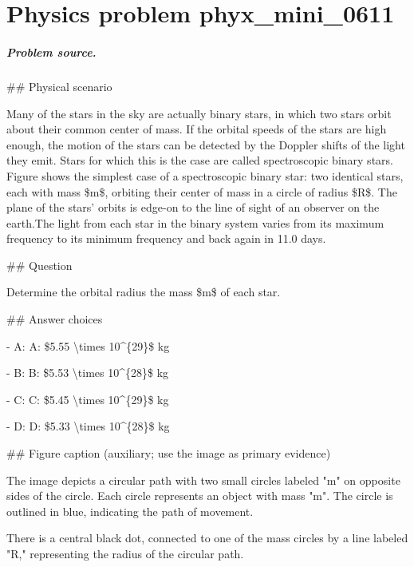 
\chapter{Physics problem phyx\_mini\_0611}
\label{ch:PhyXMiniProblems_problem_phyx_mini_0611}

\paragraph{Problem source.}
\#\# Physical scenario

Many of the stars in the sky are actually binary stars, in which two stars orbit about their common center of mass. If the orbital speeds of the stars are high enough, the motion of the stars can be detected by the Doppler shifts of the light they emit. Stars for which this is the case are called spectroscopic binary stars. Figure shows the simplest case of a spectroscopic binary star: two identical stars, each with mass \$m\$, orbiting their center of mass in a circle of radius \$R\$. The plane of the stars' orbits is edge-on to the line of sight of an observer on the earth.The light from each star in the binary system varies from its maximum frequency to its minimum frequency and back again in 11.0 days.

\#\# Question

Determine the orbital radius the mass \$m\$ of each star.

\#\# Answer choices

- A: A: \$5.55 \textbackslash{}times 10\textasciicircum{}\{29\}\$ kg

- B: B: \$5.53 \textbackslash{}times 10\textasciicircum{}\{28\}\$ kg

- C: C: \$5.45 \textbackslash{}times 10\textasciicircum{}\{29\}\$ kg

- D: D: \$5.33 \textbackslash{}times 10\textasciicircum{}\{28\}\$ kg

\#\# Figure caption (auxiliary; use the image as primary evidence)

The image depicts a circular path with two small circles labeled "m" on opposite sides of the circle. Each circle represents an object with mass "m". The circle is outlined in blue, indicating the path of movement. 

There is a central black dot, connected to one of the mass circles by a line labeled "R," representing the radius of the circular path. 

